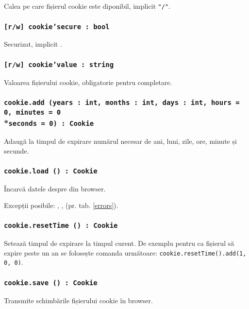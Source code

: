 Calea pe care fișierul cookie este diponibil, implicit \texttt{"/"}.

\subsubsection{\texttt{[r/w] cookie'secure : bool}}

Securizat, implicit \false.

\subsubsection{\texttt{[r/w] cookie'value : string}}

Valoarea fișierului cookie, obligatorie pentru completare.

\subsubsection{\texttt{cookie.add (years : int, months : int, days : int, hours = 0, minutes = 0}\\*\noindent\texttt{seconds = 0) : Cookie}}

Adaugă la timpul de expirare numărul necesar de ani, luni, zile, ore, minute și secunde.

\subsubsection{\texttt{cookie.load () : Cookie}}

Încarcă datele despre \cookie{} din browser.

Excepții posibile: , ,  (pr. tab. \ref{errors}).

\subsubsection{\texttt{cookie.resetTime () : Cookie}}

Setează timpul de expirare la timpul curent. De exemplu pentru ca fișierul să expire peste un an se folosește comanda următoare: \texttt{cookie.resetTime().add(1, 0, 0)}.

\subsubsection{\texttt{cookie.save () : Cookie}}

Transmite schimbările fișierului cookie în browser.

